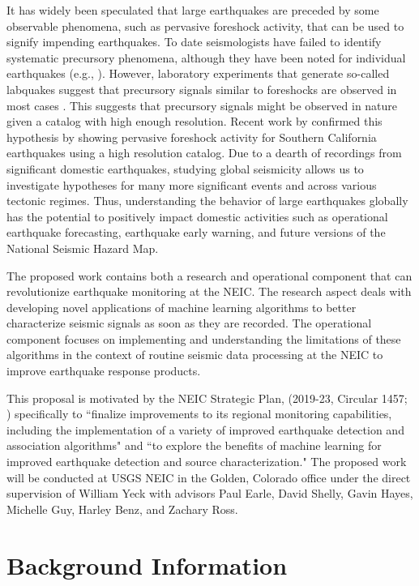 \documentclass[12p]{article}
\begin{document}
It has widely been speculated that large earthquakes are preceded by some observable phenomena, such as pervasive
foreshock activity, that can be used to signify impending earthquakes. To date seismologists have failed to identify
systematic precursory phenomena, although they have been noted for individual earthquakes (e.g., \cite{Kanamori1981,
Shearer2009, Kato2012, Bouchon2013, Brodsky2014, Panet2018}). However, laboratory experiments that generate so-called
labquakes suggest that precursory signals similar to foreshocks are observed in most cases \citep{Goebel2013,
RouetLeduc2017, Bolton2019}. This suggests that precursory signals might be observed in nature given a catalog with high
enough resolution. Recent work by \citet{Trugman2019} confirmed this hypothesis by showing pervasive foreshock activity
for Southern California earthquakes using a high resolution catalog. Due to a dearth of recordings from significant
domestic earthquakes, studying global seismicity allows us to investigate hypotheses for many more significant events
and across various tectonic regimes. Thus, understanding the behavior of large earthquakes globally has the potential to
positively impact domestic activities such as operational earthquake forecasting, earthquake early warning, and future
versions of the National Seismic Hazard Map.

The proposed work contains both a research and operational component that can revolutionize earthquake monitoring at the
NEIC. The research aspect deals with developing novel applications of machine learning algorithms to better characterize
seismic signals as soon as they are recorded. The operational component focuses on implementing and understanding the
limitations of these algorithms in the context of routine seismic data processing at the NEIC to improve earthquake
response products.

This proposal is motivated by the NEIC Strategic Plan, (2019-23, Circular 1457; \cite{Hayes2019sp}) specifically to
``finalize improvements to its regional monitoring capabilities, including the implementation of a variety of improved
earthquake detection and association algorithms" and ``to explore the benefits of machine learning for improved
earthquake detection and source characterization." The proposed work will be conducted at USGS NEIC in the Golden,
Colorado office under the direct supervision of William Yeck with advisors Paul Earle, David Shelly, Gavin Hayes,
Michelle Guy, Harley Benz, and Zachary Ross.

\section{Background Information}
\end{document}
